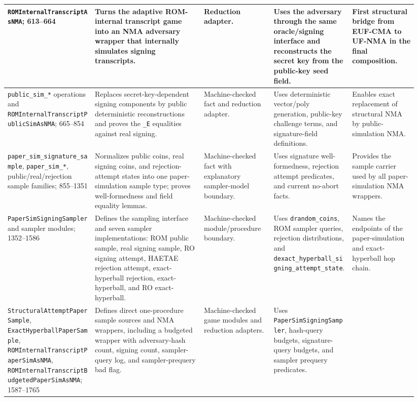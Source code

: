 \documentclass[11pt]{report}
\DeclareRobustCommand{\ec}[1]{\ifmmode\text{\nolinkurl{#1}}\else\nolinkurl{#1}\fi}
\theoremstyle{definition}
\theoremstyle{plain}
\begin{document}
{\begin{longtable}{p{0.20\linewidth}p{0.25\linewidth}p{0.16\linewidth}p{0.18\linewidth}p{0.15\linewidth}}
\midrule
\ec{ROMInternalTranscriptAsNMA}; 613--664 &
Turns the adaptive ROM-internal transcript game into an NMA adversary wrapper
that internally simulates signing transcripts. &
Reduction adapter. &
Uses the adversary through the same oracle/signing interface and reconstructs
the secret key from the public-key seed field. &
First structural bridge from EUF-CMA to UF-NMA in the final composition. \\
\midrule
\ec{public\_sim\_*} operations and \ec{ROMInternalTranscriptPublicSimAsNMA};
665--854 &
Replaces secret-key-dependent signing components by public deterministic
reconstructions and proves the \ec{\_E} equalities against real signing. &
Machine-checked fact and reduction adapter. &
Uses deterministic vector/poly generation, public-key challenge terms, and
signature-field definitions. &
Enables exact replacement of structural NMA by public-simulation NMA. \\
\midrule
\ec{paper\_sim\_signature\_sample},
\ec{paper\_sim\_*}, public/real/rejection sample families; 855--1351 &
Normalizes public coins, real signing coins, and rejection-attempt states into
one paper-simulation sample type; proves well-formedness and field equality
lemmas. &
Machine-checked fact with explanatory sampler-model boundary. &
Uses signature well-formedness, rejection attempt predicates, and current
no-abort facts. &
Provides the sample carrier used by all paper-simulation NMA wrappers. \\
\midrule
\ec{PaperSimSigningSampler} and sampler modules; 1352--1586 &
Defines the sampling interface and seven sampler implementations: ROM public
sample, real signing sample, RO signing attempt, HAETAE rejection attempt,
exact-hyperball rejection, exact-hyperball, and RO exact-hyperball. &
Machine-checked module/procedure boundary. &
Uses \ec{drandom\_coins}, ROM sampler queries, rejection distributions, and
\ec{dexact\_hyperball\_signing\_attempt\_state}. &
Names the endpoints of the paper-simulation and exact-hyperball hop chain. \\
\midrule
\ec{StructuralAttemptPaperSample}, \ec{ExactHyperballPaperSample},
\ec{ROMInternalTranscriptPaperSimAsNMA},
\ec{ROMInternalTranscriptBudgetedPaperSimAsNMA}; 1587--1765 &
Defines direct one-procedure sample sources and NMA wrappers, including a
budgeted wrapper with adversary-hash count, signing count, sampler-query log,
and sampler-prequery bad flag. &
Machine-checked game modules and reduction adapters. &
Uses \ec{PaperSimSigningSampler}, hash-query budgets, signature-query budgets,
and sampler prequery predicates. &

\end{longtable}}
\end{document}
